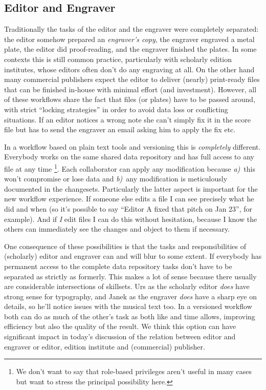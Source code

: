 \documentclass[11pt,a4paper]{article}
\begin{document}
\subsection{Editor and Engraver}
Traditionally the tasks of the editor and the engraver were completely separated: the
editor somehow prepared an \emph{engraver's copy}, the engraver engraved a metal plate,
the editor did proof-reading, and the engraver finished the plates. In some contexts
this is still common practice, particularly with scholarly edition institutes, whose
editors often don't do any engraving at all. On the other hand many commercial
publishers expect the editor to deliver (nearly) print-ready files that can be
finished in-house with minimal effort (and investment). However, all of these workflows
share the fact that files (or plates) have to be passed around, with strict
“locking strategies” in order to avoid data loss or conflicting situations. If an editor
notices a wrong note she can't simply fix it in the score file but has to send the
engraver an email asking him to apply the fix etc.

In a workflow based on plain text tools and versioning this is \emph{completely} different.
Everybody works on the same shared data repository and has full access to any file at any
time%
\footnote{We don't want to say that role-based privileges aren't useful in many cases
but want to stress the principal possibility here.}.
Each collaborator can apply any modification because 
\mbox{\emph{a)} this} won't compromise or lose data and
\mbox{\emph{b)} any} modification is meticulously documented in the changesets.
Particularly the latter aspect is important for the new workflow experience. If someone
else edits a file I can see precisely what he did and when (so it's possible to say
“Editor A fixed that pitch on Jan 23”, for example). And if \emph{I} edit files I can
do this without hesitation, because I know the others can immediately see the changes
and object to them if necessary.

One consequence of these possibilities is that the tasks and responsibilities of
(scholarly) editor and engraver can and will blur to some extent. If everybody has
permanent access to the complete data repository tasks don't have to be separated as
strictly as formerly. This makes a lot of sense because there usually are considerable
intersections of skillsets. Urs as the scholarly editor \emph{does} have strong sense
for typography, and Janek as the engraver \emph{does} have a sharp eye on details, so
he'll notice issues with the musical text too. In a versioned workflow both can do
as much of the other's task as both like and time allows, improving efficiency but also
the quality of the result. We think this option can have significant impact in today's
discussion of the relation between editor and engraver or editor, edition institute and
(commercial) publisher.
\end{document}
